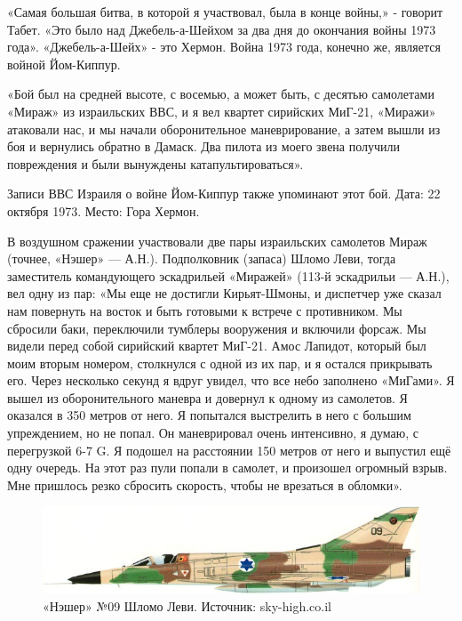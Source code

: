 «Самая большая битва, в которой я участвовал, была в конце войны,» - говорит Табет. «Это было над Джебель-а-Шейхом за два дня до окончания войны 1973 года». «Джебель-а-Шейх» - это Хермон. Война 1973 года, конечно же, является войной Йом-Киппур.

«Бой был на средней высоте, с восемью, а может быть, с десятью самолетами «Мираж» из израильских ВВС, и я вел квартет сирийских МиГ-21, «Миражи» атаковали нас, и мы начали оборонительное маневрирование, а затем вышли из боя и вернулись обратно в Дамаск. Два пилота из моего звена получили повреждения и были вынуждены катапультироваться».

Записи ВВС Израиля о войне Йом-Киппур также упоминают этот бой. Дата: 22 октября 1973. Место: Гора Хермон.

В воздушном сражении участвовали две пары израильских самолетов Мираж (точнее, «Нэшер» — А.Н.). Подполковник (запаса) Шломо Леви, тогда заместитель командующего эскадрильей «Миражей» (113-й эскадрильи — А.Н.), вел одну из пар: «Мы еще не достигли Кирьят-Шмоны, и диспетчер уже сказал нам повернуть на восток и быть готовыми к встрече с противником. Мы сбросили баки, переключили тумблеры вооружения и включили форсаж. Мы видели перед собой сирийский квартет МиГ-21. Амос Лапидот, который был моим вторым номером, столкнулся с одной из их пар, и я остался прикрывать его. Через несколько секунд я вдруг увидел, что все небо заполнено «МиГами». Я вышел из оборонительного маневра и довернул к одному из самолетов. Я оказался в 350 метров от него. Я попытался выстрелить в него с большим упреждением, но не попал. Он маневрировал очень интенсивно, я думаю, с перегрузкой 6-7 G. Я подошел на расстоянии 150 метров от него и выпустил ещё одну очередь. На этот раз пули попали в самолет, и произошел огромный взрыв. Мне пришлось резко сбросить скорость, чтобы не врезаться в обломки».

\begin{figure}[h!tb] 
	\centering\includegraphics[scale=0.5]{History_Tabett/xSfSfyQ3-y8.jpg}
	\caption{«Нэшер» №09 Шломо Леви. Источник: sky-high.co.il}%
\end{figure}

